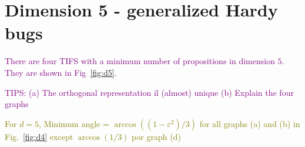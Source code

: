 \documentclass[%
  twocolumn,
 showpacs,
 showkeys,
 preprintnumbers,
 amsmath,amssymb,
 aps,
  pra,
  longbibliography,
 floatfix,
 ]{revtex4-1}
\newcommand{\jr}[1]{\textcolor{purple}{#1}}
\newcommand{\meil}[1]{\textcolor{olive}{#1}}
\begin{document}


\section{Dimension 5 - generalized Hardy bugs}

\jr{There are four TIFS with a minimum number of propositions in dimension $5$. They are shown in Fig~\ref{fig:d5}.}

\jr{TIPS: (a) The orthogonal representation il (almost) unique (b) Explain the four graphs}

\meil{For $d=5$, Minimum angle = $\arccos((1-\varepsilon^2)/3)$ for all graphs (a) and (b) in Fig.~\ref{fig:d4} except $\arccos(1/3)$ por graph (d)}

\end{document}

